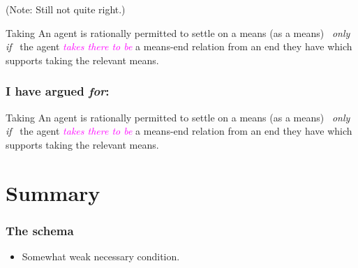 \documentclass[noamssymb, compress, handout]{beamer} %
\newcommand{\hozlinedash}[0]{%
  \noindent\hdashrule[0.5ex][c]{\textwidth}{.1pt}{2.5pt}
}
\begin{document}
\begin{frame}
  (Note: Still not quite right.)

  \hozlinedash

  {\footnotesize
    \begin{block}{Taking}
      An agent is rationally permitted to settle on a means (as a means)
      \newline
      \mbox{ }\hfill\emph{only if}\hfill\mbox{ }
      \newline
      the agent \textcolor{fuchsia}{\emph{takes there to be}}  a means-end relation from an end they have which supports taking the relevant means.
    \end{block}
  }
\end{frame}

\begin{frame}
  \frametitle{I have argued \emph{for}:}
    \begin{block}{Taking}
    An agent is rationally permitted to settle on a means (as a means)
    \newline
    \mbox{ }\hfill\emph{only if}\hfill\mbox{ }
    \newline
    the agent \textcolor{fuchsia}{\emph{takes there to be}} a means-end relation from an end they have which supports taking the relevant means.
  \end{block}
\end{frame}

\section{Summary}
\label{sec:summary}


\begin{frame}
  \frametitle{The schema}



  \begin{itemize}
  \item Somewhat weak necessary condition.
    
  \end{itemize}
\end{frame}
\end{document}
